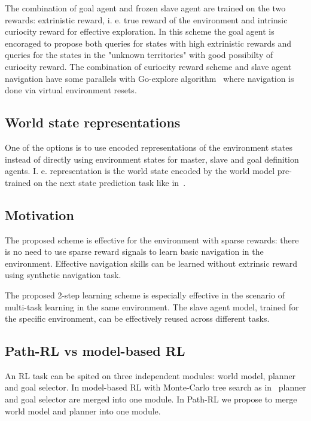 \documentclass{article}
\begin{document}
The combination of goal agent and frozen slave agent are trained on the two rewards: extrinistic reward, i. e. true reward of the environment and intrinsic curiocity reward for effective exploration. In this scheme the goal agent is encoraged to propose both queries for states with high extrinistic rewards and queries for the states in the "unknown territories" with good possibilty of curiocity reward. The combination of curiocity reward scheme and slave agent navigation have some parallels with Go-explore algorithm~\citep{Ecoffet2019GoExploreAN} where navigation is done via virtual environment resets.

\subsection{World state representations}

One of the options is to use encoded representations of the environment states instead of directly using environment states for master, slave and goal definition agents. I. e. representation is the world state encoded by the world model pre-trained on the next state prediction task like in~\citep{Ha2018RecurrentWM}.

\subsection{Motivation}

The proposed scheme is effective for the environment with sparse rewards: there is no need to use sparse reward signals to learn basic navigation in the environment. Effective navigation skills can be learned without extrinsic reward using synthetic navigation task.

The proposed 2-step learning scheme is especially effective in the scenario of multi-task learning in the same environment. The slave agent model, trained for the specific environment, can be effectively reused across different tasks.

\subsection{Path-RL vs model-based RL}

An RL task can be spited on three independent modules: world model, planner and goal selector. In model-based RL with Monte-Carlo tree search as in~\citep{Schrittwieser2020MasteringAG} planner and goal selector are merged into one module. In Path-RL we propose to merge world model and planner into one module.
\end{document}
